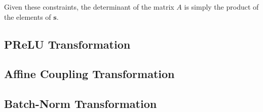 Given these constraints, the determinant of the matrix $A$ is simply the product
of the elements of $\mathbf{s}$.

\subsection{PReLU Transformation}
\subsection{Affine Coupling Transformation}
\subsection{Batch-Norm Transformation}

